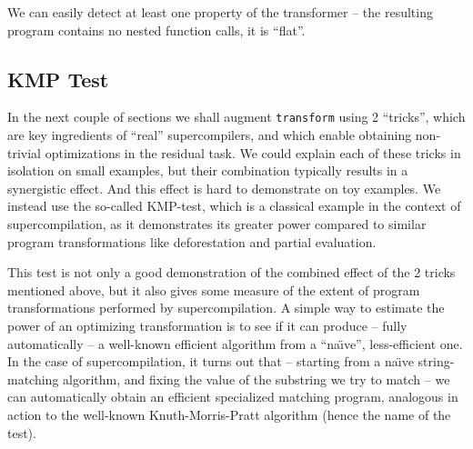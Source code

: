 We can easily detect at least one property of the transformer -- the resulting program
contains no nested function calls, it is ``flat''.

\subsection{KMP Test}

In the next couple of sections we shall augment \texttt{transform} using 2 ``tricks'',
which are key ingredients of ``real'' supercompilers, and which enable obtaining
non-trivial optimizations in the residual task.
We could explain each of these tricks in isolation on small examples,
but their combination typically results in a synergistic effect.
And this effect is hard to demonstrate on toy examples.
We instead use the so-called KMP-test, which is
a classical example in the context of supercompilation, as it demonstrates its greater
power compared to similar program transformations like deforestation and partial 
evaluation\cite{Sorensen1994TurchinSupercompiler,Sorensen1998Introduction}.

This test is not only a good demonstration of the combined effect of the 2 tricks mentioned above,
but it also gives some measure of the extent of program transformations performed by supercompilation.
A simple way to estimate the power of an optimizing transformation is to see if it
can produce -- fully automatically -- a well-known efficient algorithm
from a ``na\"{\i}ve'', less-efficient one.
In the case of supercompilation, it turns out that
-- starting from a na\"{\i}ve string-matching algorithm, 
and fixing the value of the substring we try to match --
we can automatically obtain an efficient specialized matching program,
analogous in action to the well-known Knuth-Morris-Pratt algorithm \cite{Knuth1977Fast}
(hence the name of the test).

